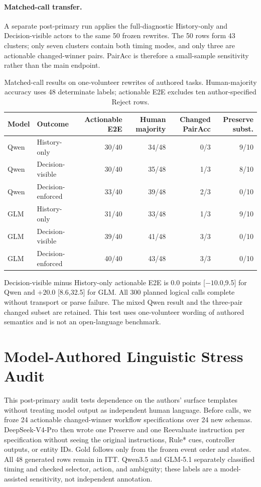 \documentclass[10pt]{article}
\begin{document}
\paragraph{Matched-call transfer.}
A separate post-primary run applies the full-diagnostic History-only and Decision-visible actors to
the same 50 frozen rewrites. The 50 rows form 43 clusters; only seven clusters contain both timing
modes, and only three are actionable changed-winner pairs. PairAcc is therefore a small-sample
sensitivity rather than the main endpoint.
\begin{table}[H]
\centering
\small
\begin{tabular}{llrrrr}
\toprule
Model & Outcome & Actionable E2E & Human majority & Changed PairAcc & Preserve subst. \\
\midrule
Qwen & History-only & 30/40 & 34/48 & 0/3 & 9/10 \\
Qwen & Decision-visible & 30/40 & 35/48 & 1/3 & 8/10 \\
Qwen & Decision-enforced & 33/40 & 39/48 & 2/3 & 0/10 \\
GLM & History-only & 31/40 & 33/48 & 1/3 & 9/10 \\
GLM & Decision-visible & 39/40 & 41/48 & 3/3 & 0/10 \\
GLM & Decision-enforced & 40/40 & 43/48 & 3/3 & 0/10 \\
\bottomrule
\end{tabular}
\caption{Matched-call results on one-volunteer rewrites of authored tasks. Human-majority
accuracy uses 48 determinate labels; actionable E2E excludes ten author-specified Reject rows.}
\label{tab:supp-human-rewrite-matched}
\end{table}
Decision-visible minus History-only actionable E2E is 0.0 points [$-10.0$,9.5] for Qwen and
$+20.0$ [8.6,32.5] for GLM. All 300 planned logical calls complete without transport or
parse failure. The mixed Qwen result and the three-pair changed subset are retained. This test uses
one-volunteer wording of authored semantics and is not an open-language benchmark.

\section{Model-Authored Linguistic Stress Audit}
This post-primary audit tests dependence on the authors' surface templates without treating model
output as independent human language. Before calls, we froze 24 actionable changed-winner workflow
specifications over 24 new schemas. DeepSeek-V4-Pro then wrote one Preserve and one Reevaluate
instruction per specification without seeing the original instructions, Rule* cues, controller
outputs, or entity IDs. Gold follows only from the frozen event order and states. All 48 generated
rows remain in ITT. Qwen3.5 and GLM-5.1 separately classified timing and checked selector, action,
and ambiguity; these labels are a model-assisted sensitivity, not independent annotation.
\end{document}
